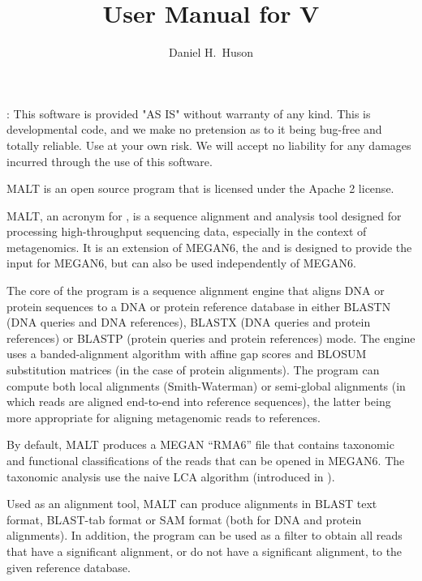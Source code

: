 \documentclass[11pt]{article}
\title{\bf User Manual for \MALT V\VERSION}
\author{Daniel H.~Huson}
\newcommand\MALT{{\sf MALT}\xspace}
\begin{document}

\maketitle


{\small
\setcounter{tocdepth}{1}
\tableofcontents
}


:
This software is provided "AS IS" without warranty of any kind. This is 
developmental code, and we make no pretension as to it being bug-free and 
totally reliable. Use at your own risk. We will accept no liability for any 
damages incurred through the use of this software.

\MALT is an open source program that is licensed under the Apache 2 license.

\MALT, an acronym for  , is a sequence alignment and analysis tool designed for processing high-throughput sequencing data, especially in the context of metagenomics.
It is an extension of MEGAN6, the  and is designed to provide the input for MEGAN6,
but can also be used independently of MEGAN6.

The core of the program is a sequence alignment engine that aligns DNA or protein sequences
to a {DNA or} protein reference database in either {BLASTN (DNA queries and DNA references),}
BLASTX (DNA queries and protein references) or BLASTP (protein queries and protein references)
mode. The engine uses a banded-alignment algorithm with affine gap scores
and BLOSUM substitution matrices (in the case of protein alignments).
The program can compute both local alignments
(Smith-Waterman) or semi-global alignments (in which reads are aligned end-to-end into reference sequences), the latter being more appropriate for aligning metagenomic reads to references.

By default, \MALT produces a MEGAN ``RMA6'' file that contains taxonomic and functional classifications of the reads
that can be opened in MEGAN6.
The taxonomic analysis use the naive LCA algorithm (introduced in \cite{MEGAN2011}).

Used as an alignment tool,  \MALT can produce  alignments in BLAST  text format,
BLAST-tab format or SAM format (both for DNA and protein alignments).
In addition, the program can be used as a filter to obtain all reads that have a significant alignment, or
do not have a significant alignment, to the given reference database.
\end{document}
